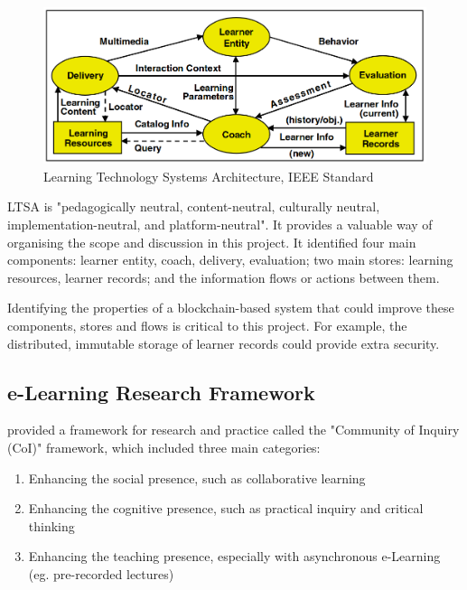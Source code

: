 \begin{figure}[!ht] 
    \centering    
    \includegraphics[width=1.0\textwidth]{ltsa2003}
    \caption[Learning Technology Systems Architecture]
        {Learning Technology Systems Architecture, IEEE Standard \citep[p.9]{ieee2003ltsa}}
    \label{fig:LTSA}
\end{figure}

LTSA is "pedagogically neutral, content-neutral, culturally neutral, implementation-neutral, 
and platform-neutral"\citep[p.1]{ieee2003ltsa}. It provides a valuable way of organising 
the scope and discussion in this project. It identified four main components: learner entity, coach, 
delivery, evaluation; two main stores: learning resources, learner records; and the information flows 
or actions between them.

Identifying the properties of a blockchain-based system that could improve these components, stores and 
flows is critical to this project. For example, the distributed, immutable storage of learner records could 
provide extra security.

\subsection{e-Learning Research Framework}

\citet{garrison2011learning} provided a framework for research and practice called the "Community 
of Inquiry (CoI)" framework, which included three main categories:

\begin{enumerate}
    \setlength\itemsep{0em}    
    \item Enhancing the social presence, such as collaborative learning
    \item Enhancing the cognitive presence, such as practical inquiry and critical thinking
    \item Enhancing the teaching presence, especially with asynchronous e-Learning (eg. pre-recorded lectures)
\end{enumerate}

